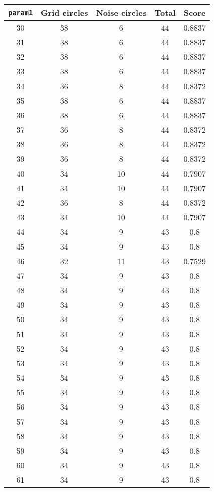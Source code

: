 \documentclass[letterpaper, 12pt]{article}
\begin{document}
\begin{longtable}{|c|c|c|c|c|}
\hline
\textbf{\texttt{param1}} & \textbf{Grid circles} & \textbf{Noise circles} & \textbf{Total} & \textbf{Score} \\
\hline
30 & 38 & 6 & 44 & 0.8837 \\
\hline
31 & 38 & 6 & 44 & 0.8837 \\
\hline
32 & 38 & 6 & 44 & 0.8837 \\
\hline
33 & 38 & 6 & 44 & 0.8837 \\
\hline
34 & 36 & 8 & 44 & 0.8372 \\
\hline
35 & 38 & 6 & 44 & 0.8837 \\
\hline
36 & 38 & 6 & 44 & 0.8837 \\
\hline
37 & 36 & 8 & 44 & 0.8372 \\
\hline
38 & 36 & 8 & 44 & 0.8372 \\
\hline
39 & 36 & 8 & 44 & 0.8372 \\
\hline
40 & 34 & 10 & 44 & 0.7907 \\
\hline
41 & 34 & 10 & 44 & 0.7907 \\
\hline
42 & 36 & 8 & 44 & 0.8372 \\
\hline
43 & 34 & 10 & 44 & 0.7907 \\
\hline
44 & 34 & 9 & 43 & 0.8 \\
\hline
45 & 34 & 9 & 43 & 0.8 \\
\hline
46 & 32 & 11 & 43 & 0.7529 \\
\hline
47 & 34 & 9 & 43 & 0.8 \\
\hline
48 & 34 & 9 & 43 & 0.8 \\
\hline
49 & 34 & 9 & 43 & 0.8 \\
\hline
50 & 34 & 9 & 43 & 0.8 \\
\hline
51 & 34 & 9 & 43 & 0.8 \\
\hline
52 & 34 & 9 & 43 & 0.8 \\
\hline
53 & 34 & 9 & 43 & 0.8 \\
\hline
54 & 34 & 9 & 43 & 0.8 \\
\hline
55 & 34 & 9 & 43 & 0.8 \\
\hline
56 & 34 & 9 & 43 & 0.8 \\
\hline
57 & 34 & 9 & 43 & 0.8 \\
\hline
58 & 34 & 9 & 43 & 0.8 \\
\hline
59 & 34 & 9 & 43 & 0.8 \\
\hline
60 & 34 & 9 & 43 & 0.8 \\
\hline
61 & 34 & 9 & 43 & 0.8 \\

\end{longtable}
\end{document}
